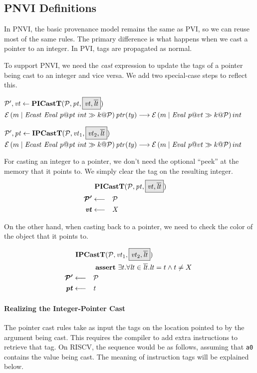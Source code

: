 \documentclass[acmsmall,review,anonymous]{acmart}\settopmatter{printfolios=true,printccs=false,printacmref=false}
\begin{document}
\subsection{PNVI Definitions}

In PNVI, the basic provenance model remains the same as PVI, so we can reuse most of the
same rules. The primary difference is what happens when we cast a pointer to an integer.
In PVI, tags are propagated as normal.

To support PNVI, we need the {\it cast} expression to update the tags of a pointer
being cast to an integer and vice versa. We add two special-case steps to reflect this.

            {\(\trule{\picasttres}{\picastt}\)}
            {\(\mathcal{E}\left(m \mid \mathit{Ecast} ~ \mathit{Eval} ~ p@\mathit{pt} ~ int \gg k @ \mathcal{P}\right){\mathit{ptr(ty)}} \longrightarrow
              \mathcal{E}\left(m \mid \mathit{Eval} ~ p@vt \gg k @ \mathcal{P}\right){int}\)}

            {\(\trule{\ipcasttres}{\ipcastt}\)}
            {\(\mathcal{E}\left(m \mid \mathit{Ecast} ~ \mathit{Eval} ~ p@\mathit{pt} ~ int \gg k @ \mathcal{P}\right){\mathit{ptr(ty)}} \longrightarrow
              \mathcal{E}\left(m \mid \mathit{Eval} ~ p@vt \gg k @ \mathcal{P}\right){int}\)}

For casting an integer to a pointer, we don't need the optional ``peek'' at the memory that it points to.
We simply clear the tag on the resulting integer.
\[\begin{aligned}
\truledef{\picastt}
\settag{\PCT'}{\PCT}
\settag{\vt}{X}
\end{aligned}\]

On the other hand, when casting back to a pointer, we need to check the color
of the object that it points to.

\[\begin{aligned}
\truledef{\ipcastt}
\assert{\exists t . \forall \lt \in \overline{\lt} . \lt = t \land t \not = X}
\settag{\PCT'}{\PCT}
\settag{\pt}{t}
\end{aligned}\]

\paragraph{Realizing the Integer-Pointer Cast}

The pointer cast rules take as input the tags on the location pointed to by the
argument being cast. This requires the compiler to add extra instructions to retrieve that tag.
On RISCV, the sequence would be as follows, assuming that {\tt a0} contains the
value being cast. The meaning of instruction tags will be explained below.
\end{document}
